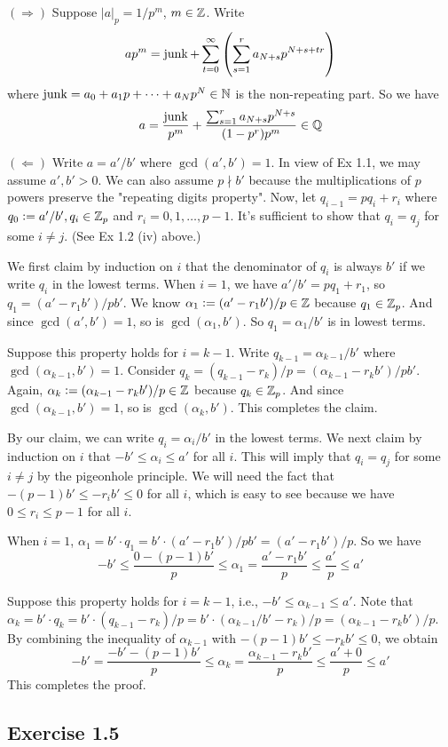 \documentclass[../Koblitz.tex]{subfiles}
\begin{document}
$(\Rightarrow)$ Suppose $|a|_p=1/p^m$, $m\in\mathbb{Z}$. Write $$ap^m=\operatorname{junk}+\sum_{t=0}^\infty \left(\sum_{s=1}^r a_{N+s}p^{N+s+tr}\right)$$ where $\operatorname{junk}=a_0+a_1p+\cdots+a_Np^N\in\mathbb{N}$ is the non-repeating part. So we have $$a = \frac{\operatorname{junk}}{p^m}+\frac{\sum_{s=1}^r a_{N+s}p^{N+s}}{(1-p^r)p^m}\in\mathbb{Q}$$

$(\Leftarrow)$ Write $a=a'/b'$ where $\gcd(a',b')=1$. In view of Ex 1.1, we may assume $a',b'>0$. We can also assume $p\nmid b'$ because the multiplications of $p$ powers preserve the "repeating digits property". Now, let $q_{i-1}=pq_i+r_i$ where $q_0:=a'/b',q_i\in\mathbb{Z}_p$ and $r_i=0,1,\ldots,p-1$. It's sufficient to show that $q_i=q_j$ for some $i\neq j$.  (See Ex 1.2 (iv) above.)

We first claim by induction on $i$ that the denominator of $q_i$ is always $b'$ if we write $q_i$ in the lowest terms. When $i=1$, we have $a'/b'=pq_1+r_1$, so $q_1=(a'-r_1b')/pb'$. We know $\alpha_1:=(a'-r_1b')/p\in\mathbb{Z}$ because $q_1\in\mathbb{Z}_p$. And since $\gcd(a',b')=1$, so is $\gcd(\alpha_1,b')$. So $q_1=\alpha_1/b'$ is in lowest terms.

Suppose this property holds for $i=k-1$. Write $q_{k-1}=\alpha_{k-1}/b'$ where $\gcd(\alpha_{k-1},b')=1$. Consider $q_k=(q_{k-1}-r_k)/p=(\alpha_{k-1}-r_kb')/pb'$. Again, $\alpha_k:=(\alpha_{k-1}-r_kb')/p\in\mathbb{Z}$ because $q_k\in\mathbb{Z}_p$. And since $\gcd(\alpha_{k-1},b')=1$, so is $\gcd(\alpha_k,b')$. This completes the claim.

By our claim, we can write $q_i=\alpha_i/b'$ in the lowest terms. We next claim by induction on $i$ that $-b'\leq \alpha_i\leq a'$ for all $i$. This will imply that $q_i=q_j$ for some $i\neq j$ by the pigeonhole principle. We will need the fact that $-(p-1)b'\leq-r_ib'\leq 0$ for all $i$, which is easy to see because we have $0\leq r_i\leq p-1$ for all $i$.

When $i=1$, $\alpha_1=b'\cdot q_1=b'\cdot(a'-r_1b')/pb'=(a'-r_1b')/p$. So we have $$-b'\leq\frac{0-(p-1)b'}{p}\leq\alpha_1 = \frac{a'-r_1b'}{p} \leq \frac{a'}{p} \leq a'$$

Suppose this property holds for $i=k-1$, i.e., $-b'\leq\alpha_{k-1}\leq a'$. Note that $\alpha_k=b'\cdot q_k=b'\cdot(q_{k-1}-r_k)/p=b'\cdot(\alpha_{k-1}/b'-r_k)/p=(\alpha_{k-1}-r_kb')/p$. By combining the inequality of $\alpha_{k-1}$ with $-(p-1)b'\leq -r_kb'\leq 0$, we obtain $$-b'=\frac{-b'-(p-1)b'}{p} \leq \alpha_k=\frac{\alpha_{k-1}-r_kb'}{p} \leq \frac{a'+0}{p} \leq a'$$ This completes the proof.

\subsection*{Exercise 1.5}
\end{document}
